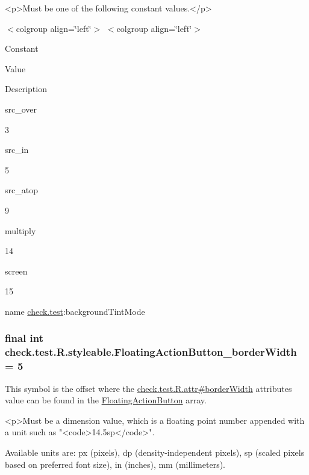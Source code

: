 \begin{DoxyVerb}      <p>Must be one of the following constant values.</p>
\end{DoxyVerb}
 \begin{TabularC}{0}
\hline
\end{TabularC}
$<$colgroup align=\char`\"{}left\char`\"{}$>$ $<$colgroup align=\char`\"{}left\char`\"{}$>$ 

Constant

Value

Description 

{\ttfamily src\+\_\+over}

3

{\ttfamily src\+\_\+in}

5

{\ttfamily src\+\_\+atop}

9

{\ttfamily multiply}

14

{\ttfamily screen}

15

name \hyperlink{namespacecheck_1_1test}{check.\+test}\+:background\+Tint\+Mode \hypertarget{classcheck_1_1test_1_1_r_1_1styleable_a170afde9a336204ba95ce5648ffd3a65}{}
\subsubsection[{Floating\+Action\+Button\+\_\+border\+Width}]{\setlength{\rightskip}{0pt plus 5cm}final int check.\+test.\+R.\+styleable.\+Floating\+Action\+Button\+\_\+border\+Width = 5\hspace{0.3cm}{\ttfamily [static]}}\label{classcheck_1_1test_1_1_r_1_1styleable_a170afde9a336204ba95ce5648ffd3a65}
This symbol is the offset where the \hyperlink{classcheck_1_1test_1_1_r_1_1attr_a8707713c11a1157d48bae6aca2c70613}{check.\+test.\+R.\+attr\#border\+Width} attribute\textquotesingle{}s value can be found in the \hyperlink{classcheck_1_1test_1_1_r_1_1styleable_ae6f501c03537511d2edaad8d699781da}{Floating\+Action\+Button} array.

\begin{DoxyVerb}      <p>Must be a dimension value, which is a floating point number appended with a unit such as "<code>14.5sp</code>".
\end{DoxyVerb}
 Available units are\+: px (pixels), dp (density-\/independent pixels), sp (scaled pixels based on preferred font size), in (inches), mm (millimeters). 

